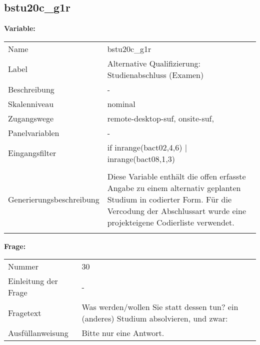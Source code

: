 	
	
	\subsection{bstu20c\_g1r}
	\label{subSection:bstu20c_g1r}

	\noindent\textbf{Variable:}\\
		\begin{tabular}{lL{11.3cm}}
			\label{tableVariable:bstu20c_g1r}
			Name & bstu20c\_g1r \\
			Label & Alternative Qualifizierung: Studienabschluss (Examen) \\
			Beschreibung & - \\
			Skalenniveau & nominal \\
			Zugangswege &
				remote-desktop-suf,
				onsite-suf,
 \\
			Panelvariablen & -
			 \\
			Eingangsfilter & if inrange(bact02,4,6) | inrange(bact08,1,3) \\
 \\
					Generierungsbeschreibung & Diese Variable enthält die offen erfasste Angabe zu einem alternativ geplanten Studium in codierter Form. Für die Vercodung der Abschlussart wurde eine projekteigene Codierliste verwendet.
				 \\	
			 \\
		\end{tabular}

		\vspace*{1 cm}
		\noindent\textbf{Frage:}\\
		\begin{tabular}{lL{11.3cm}}
			\label{tableQuestion:bstu20c_g1r}
			Nummer & 30 \\
			Einleitung der Frage & - \\
			Fragetext & Was werden/wollen Sie statt dessen tun?
ein (anderes) Studium absolvieren, und zwar: \\
			Ausfüllanweisung & Bitte nur eine Antwort. \\
		\end{tabular}





